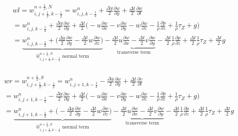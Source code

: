 \documentclass{article}
\numberwithin{equation}{subsection}
\begin{document}
\begin{align}
\begin{split}
& wl = w_{i,j+\frac{1}{2},k-\frac{1}{2}}^{n+\frac{1}{2},N} = w_{i,j,k-\frac{1}{2}}^n + \frac{\Delta y}{2}\frac{\partial w}{\partial y} + \frac{\Delta t}{2}\frac{\partial w}{\partial t} \\
&= w_{i,j,k-\frac{1}{2}}^n + \frac{\Delta y}{2} \frac{\partial w}{\partial y} + \frac{\Delta t}{2} \Big( -u\frac{\partial w}{\partial x} -v\frac{\partial w}{\partial y} -w\frac{\partial w}{\partial z} - \frac{1}{\rho}\frac{\partial p}{\partial z} +\frac{1}{\rho}\tau_Z + g\Big) \\
&= \underbrace{w_{i,j,k-\frac{1}{2}}^n + \Big(\frac{\Delta y}{2}\frac{\partial w}{\partial y} - \frac{\Delta t}{2} w\frac{\partial w}{\partial z}\Big)}_\text{$\widehat{w}_{i,j+\frac{1}{2},k-\frac{1}{2}}^{n+\frac{1}{2},N}$ normal term} -\underbrace{\frac{\Delta t}{2}u\frac{\partial w}{\partial x} - \frac{\Delta t}{2}v\frac{\partial w}{\partial y}}_\text{transverse term} - \frac{\Delta t}{2}\frac{1}{\rho}\frac{\partial p}{\partial z} + \frac{\Delta t}{2}\frac{1}{\rho}\tau_Z + \frac{\Delta t}{2}g
\end{split}
\end{align}

\begin{align}
\begin{split}
& wr = w_{i,j+\frac{1}{2},k-\frac{1}{2}}^{n+\frac{1}{2},S} = w_{i,j+1,k-\frac{1}{2}}^n - \frac{\Delta y}{2}\frac{\partial w}{\partial y} + \frac{\Delta t}{2}\frac{\partial v}{\partial t} \\
&= w_{i,j+1,k-\frac{1}{2}}^n - \frac{\Delta y}{2} \frac{\partial w}{\partial y} + \frac{\Delta t}{2} \Big( -u\frac{\partial w}{\partial x} -v\frac{\partial w}{\partial y} -w\frac{\partial w}{\partial z} - \frac{1}{\rho}\frac{\partial p}{\partial z} +\frac{1}{\rho}\tau_Z + g\Big) \\
&= \underbrace{w_{i,j+1,k-\frac{1}{2}}^n + \Big(-\frac{\Delta y}{2}\frac{\partial w}{\partial y} - \frac{\Delta t}{2} w\frac{\partial w}{\partial z}\Big)}_\text{$\widehat{w}_{i,j+\frac{1}{2},k-\frac{1}{2}}^{n+\frac{1}{2},S}$ normal term} -\underbrace{\frac{\Delta t}{2}u\frac{\partial w}{\partial x} - \frac{\Delta t}{2}v\frac{\partial w}{\partial y}}_\text{transverse term} - \frac{\Delta t}{2}\frac{1}{\rho}\frac{\partial p}{\partial z} + \frac{\Delta t}{2}\frac{1}{\rho}\tau_Z + \frac{\Delta t}{2}g
\end{split}
\end{align}
\end{document}
